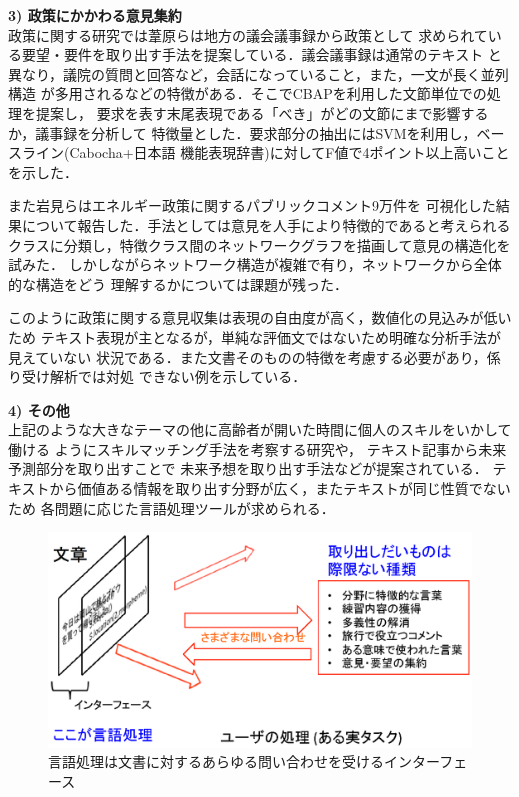 \documentclass[twocolumn]{jarticle}
\begin{document}
{\bf 3) 政策にかかわる意見集約}\\
政策に関する研究では葦原ら\cite{ashihara2012}は地方の議会議事録から政策として
求められている要望・要件を取り出す手法を提案している．議会議事録は通常のテキスト
と異なり，議院の質問と回答など，会話になっていること，また，一文が長く並列構造
が多用されるなどの特徴がある．そこでCBAP\cite{maruyama2003}を利用した文節単位での処理を提案し，
要求を表す末尾表現である「べき」がどの文節にまで影響するか，議事録を分析して
特徴量とした．要求部分の抽出にはSVMを利用し，ベースライン(Cabocha+日本語
機能表現辞書)に対してF値で4ポイント以上高いことを示した．

また岩見ら\cite{iwami2016}はエネルギー政策に関するパブリックコメント9万件を
可視化した結果について報告した．手法としては意見を人手により特徴的であると考えられる
クラスに分類し，特徴クラス間のネットワークグラフを描画して意見の構造化を試みた．
しかしながらネットワーク構造が複雑で有り，ネットワークから全体的な構造をどう
理解するかについては課題が残った．

このように政策に関する意見収集は表現の自由度が高く，数値化の見込みが低いため
テキスト表現が主となるが，単純な評価文ではないため明確な分析手法が見えていない
状況である．また文書そのものの特徴を考慮する必要があり，係り受け解析では対処
できない例を示している．

{\bf 4) その他}\\
上記のような大きなテーマの他に高齢者が開いた時間に個人のスキルをいかして働ける
ようにスキルマッチング手法を考察する研究\cite{miura2015}や，
テキスト記事から未来予測部分を取り出すことで
未来予想を取り出す手法\cite{shimaoka2015}などが提案されている．
テキストから価値ある情報を取り出す分野が広く，またテキストが同じ性質でないため
各問題に応じた言語処理ツールが求められる．


\begin{figure}[t]
\begin{center}
\includegraphics[scale=0.4]{fig/lang.eps}
\end{center}
\caption {言語処理は文書に対するあらゆる問い合わせを受けるインターフェース}
\label{fig:lang}
\end{figure}
\end{document}
